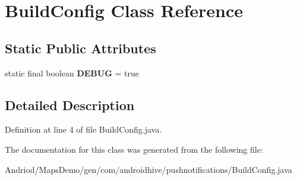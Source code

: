 \hypertarget{classcom_1_1androidhive_1_1pushnotifications_1_1_build_config}{\section{Build\-Config Class Reference}
\label{classcom_1_1androidhive_1_1pushnotifications_1_1_build_config}
}
\subsection*{Static Public Attributes}
\begin{DoxyCompactItemize}
\item 
\hypertarget{classcom_1_1androidhive_1_1pushnotifications_1_1_build_config_a8270736aa6257cdc33f11a875840a05e}{static final boolean {\bfseries D\-E\-B\-U\-G} = true}\label{classcom_1_1androidhive_1_1pushnotifications_1_1_build_config_a8270736aa6257cdc33f11a875840a05e}

\end{DoxyCompactItemize}


\subsection{Detailed Description}


Definition at line 4 of file Build\-Config.\-java.



The documentation for this class was generated from the following file\-:\begin{DoxyCompactItemize}
\item 
Andriod/\-Maps\-Demo/gen/com/androidhive/pushnotifications/Build\-Config.\-java\end{DoxyCompactItemize}
